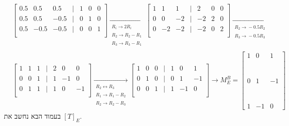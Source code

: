 \documentclass[11pt, oneside]{article}
\newcommand{\br}{\\\\\\\\\\\\\\}
\newcommand{\opr}[1]{\xrightarrow[\text{#1}]{}}
\newcommand{\oprm}[1]{\underset{\substack{#1}}{\longrightarrow}}
\newcommand{\bidiarrow}[1]{\underset{\text{#1}}{\leftrightarrow}}
\begin{document}
\begin{align*}
& \begin{bmatrix}
0.5 & 0.5 & 0.5 & \mid & 1 & 0 & 0\\
0.5 & 0.5 & -0.5 & \mid & 0 & 1 & 0\\
0.5 & -0.5 & -0.5 & \mid & 0 & 0 & 1\\
\end{bmatrix}
\oprm{%
R_i \opr{} 2R_i\\
R_2 \opr{} R_2 - R_1\\
R_3 \opr{} R_3 - R_1
}
\begin{bmatrix}
1 & 1 & 1 & \mid & 2 & 0 & 0\\
0 & 0 & -2 & \mid & -2 & 2 & 0\\
0 & -2 & -2 & \mid & -2 & 0 & 2\\
\end{bmatrix}
\oprm{%
R_2 \opr{} -0.5R_2\\
R_3 \opr{} -0.5R_3\\
}\\
& \begin{bmatrix}
1 & 1 & 1 & \mid & 2 & 0 & 0\\
0 & 0 & 1 & \mid & 1 & -1 & 0\\
0 & 1 & 1 & \mid & 1 & 0 & -1\\
\end{bmatrix}
\oprm{%
R_2 \bidiarrow{} R_3\\
R_1 \opr{} R_1 - R_2\\
R_2 \opr{} R_2 - R_3
}
\begin{bmatrix}
1 & 0 & 0 & \mid & 1 & 0 & 1\\
0 & 1 & 0 & \mid & 0 & 1 & -1\\
0 & 0 & 1 & \mid & 1 & -1 & 0\\
\end{bmatrix}
\opr{}
M^{B}_{E} = \begin{bmatrix}
1 & 0 & 1\br
0 & 1 & -1\br
1 & -1 & 0
\end{bmatrix}
\end{align*}
בעמוד הבא נחשב את $[T]_E$.
\clearpage
\setcounter{subsection}{0}
\end{document}
